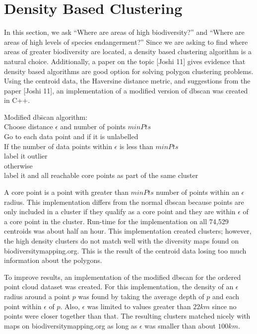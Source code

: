 \documentclass[11pt, fullpage,letterpaper]{article}
\renewcommand{\cite}[1]{[#1]}
\begin{document}
	\section{Density Based Clustering}
		In this section, we ask ``Where are areas of high biodiversity?'' and ``Where are areas of high levels of species endangerment?'' Since we are asking to find where areas of greater biodiversity are located, a density based clustering algorithm is a natural choice. Additionally, a paper on the topic \cite{Joshi 11} gives evidence that density based algorithms are good option for solving polygon clustering problems. Using the centroid data, the Haversine distance metric, and suggestions from the paper \cite{Joshi 11}, an implementation of a modified version of dbscan was created in C++.
		\begin{tabbing}
			Mod\= ifie\= d db\= scan algorithm:\\
			\> Choose distance $\epsilon$ and number of points $minPts$\\
			\> Go to each data point and if it is unlabelled\\
			\> \> If the number of data points within $\epsilon$ is less than $minPts$\\
			\> \> \> label it outlier\\
			\> \> otherwise\\
			\> \> \> label it and all reachable core points as part of the same cluster\\
		\end{tabbing}

		A core point is a point with greater than $minPts$ number of points within an $\epsilon$ radius. This implementation differs from the normal dbscan because points are only included in a cluster if they qualify as a core point and they are within $\epsilon$ of a core point in the cluster. Run-time for the implementation on all  74,529 centroids was about half an hour. This implementation created clusters; however, the high density clusters do not match well with the diversity maps found on biodiversitymapping.org. This is the result of the centroid data losing too much information about the polygons.
		
		To improve results, an implementation of the modified dbscan for the ordered point cloud dataset was created. For this implementation, the density of an $\epsilon$ radius around a point $p$ was found by taking the average depth of $p$ and each point within $\epsilon$ of $p$. Also, $\epsilon$ was limited to values greater than $22km$ since no points were closer together than that. The resulting clusters matched nicely with maps on biodiversitymapping.org as long as $\epsilon$ was smaller than about $100km$.
		
\end{document}
